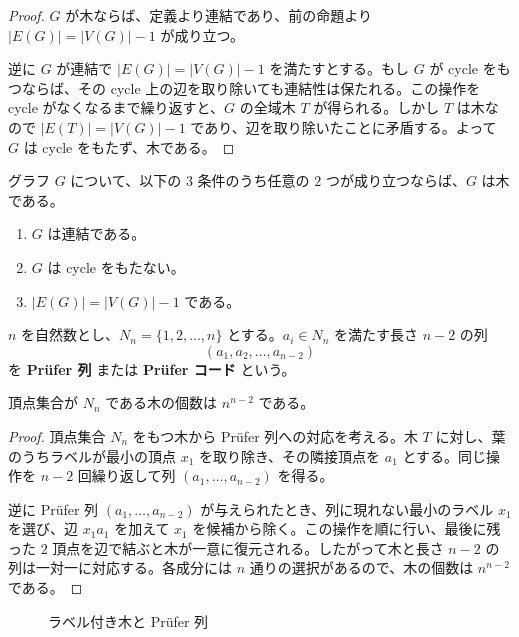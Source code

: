 \documentclass[article,paper=a4paper]{jlreq}
\begin{document}
\begin{proof}
  $G$ が木ならば、定義より連結であり、前の命題より $|E(G)|=|V(G)|-1$ が成り立つ。

  逆に $G$ が連結で $|E(G)|=|V(G)|-1$ を満たすとする。もし $G$ が cycle をもつならば、その cycle 上の辺を取り除いても連結性は保たれる。この操作を cycle がなくなるまで繰り返すと、$G$ の全域木 $T$ が得られる。しかし $T$ は木なので $|E(T)|=|V(G)|-1$ であり、辺を取り除いたことに矛盾する。よって $G$ は cycle をもたず、木である。
\end{proof}

\begin{cor}
  グラフ $G$ について、以下の $3$ 条件のうち任意の $2$ つが成り立つならば、$G$ は木である。
  \begin{enumerate}[label=(\arabic*)\, ]
    \item $G$ は連結である。
    \item $G$ は cycle をもたない。
    \item $|E(G)|=|V(G)|-1$ である。
  \end{enumerate}
\end{cor}

\begin{dfn}
  $n$ を自然数とし、$N_n=\{1,2,\ldots,n\}$ とする。$a_i\in N_n$ を満たす長さ $n-2$ の列
  \[
    (a_1,a_2,\ldots,a_{n-2})
  \]
  を \textbf{Pr\"ufer 列} または \textbf{Pr\"ufer コード} という。
\end{dfn}

\begin{prop}
  頂点集合が $N_n$ である木の個数は $n^{n-2}$ である。
\end{prop}

\begin{proof}
  頂点集合 $N_n$ をもつ木から Pr\"ufer 列への対応を考える。木 $T$ に対し、葉のうちラベルが最小の頂点 $x_1$ を取り除き、その隣接頂点を $a_1$ とする。同じ操作を $n-2$ 回繰り返して列 $(a_1,\ldots,a_{n-2})$ を得る。

  逆に Pr\"ufer 列 $(a_1,\ldots,a_{n-2})$ が与えられたとき、列に現れない最小のラベル $x_1$ を選び、辺 $x_1a_1$ を加えて $x_1$ を候補から除く。この操作を順に行い、最後に残った $2$ 頂点を辺で結ぶと木が一意に復元される。したがって木と長さ $n-2$ の列は一対一に対応する。各成分には $n$ 通りの選択があるので、木の個数は $n^{n-2}$ である。
\end{proof}

\begin{figure}[htbp]
  \centering
  \caption{ラベル付き木と Pr\"ufer 列}
\end{figure}
\end{document}
